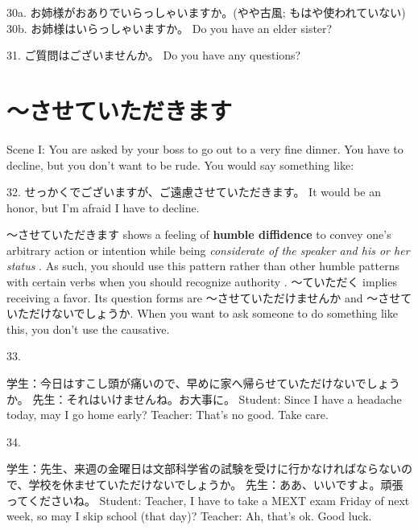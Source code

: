 \par{30a. お姉様がおありでいらっしゃいますか。(やや古風; もはや使われていない) \hfill\break
30b. お姉様はいらっしゃいますか。 \hfill\break
Do you have an elder sister? }

\par{31. ご質問はございませんか。 \hfill\break
Do you have any questions? }
      
\section{～させていただきます}
 
\par{Scene I: You are asked by your boss to go out to a very fine dinner. You have to decline, but you don't want to be rude. You would say something like: }

\par{32. せっかくでございますが、ご遠慮させていただきます。 \hfill\break
It would be an honor, but I'm afraid I have to decline. }

\par{～させていただきます shows a feeling of \textbf{humble diffidence }to convey one's arbitrary action or intention while being \emph{considerate of the speaker and his or her status }. As such, you should use this pattern rather than other humble patterns with certain verbs when you should recognize authority . ～ていただく implies receiving a favor. Its question forms are ～させていただけませんか and ～させていただけないでしょうか. When you want to ask someone to do something like this, you don't use the causative. }

\par{33. }

\par{学生：今日はすこし頭が痛いので、早めに家へ帰らせていただけないでしょうか。 \hfill\break
先生：それはいけませんね。お大事に。 \hfill\break
Student: Since I have a headache today, may I go home early? \hfill\break
Teacher: That's no good. Take care. }

\par{34. }

\par{学生：先生、来週の金曜日は文部科学省の試験を受けに行かなければならないので、学校を休ませていただけないでしょうか。 \hfill\break
先生：ああ、いいですよ。頑張ってくださいね。 \hfill\break
Student: Teacher, I have to take a MEXT exam Friday of next week, so may I skip school (that day)? \hfill\break
Teacher: Ah, that's ok. Good luck. }


